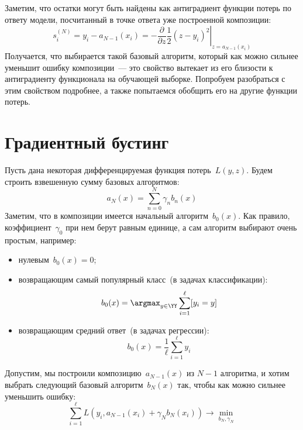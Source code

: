 \documentclass[12pt,fleqn]{article}
\begin{document}
Заметим, что остатки могут быть найдены как антиградиент функции потерь по ответу модели,
посчитанный в точке ответа уже построенной композиции:
\[
    s_i^{(N)}
    =
    y_i
    -
    a_{N - 1}(x_i)
    =
    -
    \left.
    \frac{\partial}{\partial z}
    \frac12
    (z - y_i)^2
    \right|_{z = a_{N - 1}(x_i)}
\]
Получается, что выбирается такой базовый алгоритм, который как можно
сильнее уменьшит ошибку композиции~--- это свойство вытекает из его близости
к антиградиенту функционала на обучающей выборке.
Попробуем разобраться с этим свойством подробнее, а также попытаемся обобщить его
на другие функции потерь.

\section{Градиентный бустинг}
Пусть дана некоторая дифференцируемая функция потерь~$L(y, z)$.
Будем строить взвешенную сумму базовых алгоритмов:
\[
    a_N(x)
    =
    \sum_{n = 0}^{N}
        \gamma_n b_n(x)
\]
Заметим, что в композиции имеется начальный алгоритм~$b_0(x)$.
Как правило, коэффициент~$\gamma_0$ при нем берут равным единице,
а сам алгоритм выбирают очень простым, например:
\begin{itemize}
    \item нулевым~$b_0(x) = 0$;
    \item возвращающим самый популярный класс~(в задачах классификации):
        \[
            b_0(x) = \argmax_{y \in \YY} \sum_{i = 1}^{\ell} [y_i = y]
        \]
    \item возвращающим средний ответ~(в задачах регрессии):
        \[
            b_0(x) = \frac{1}{\ell} \sum_{i = 1}^{\ell} y_i
        \]
\end{itemize}

Допустим, мы построили композицию~$a_{N - 1}(x)$ из $N - 1$ алгоритма,
и хотим выбрать следующий базовый алгоритм~$b_N(x)$ так, чтобы как можно сильнее
уменьшить ошибку:
\[
    \sum_{i = 1}^{\ell}
        L(y_i, a_{N - 1}(x_i) + \gamma_N b_N(x_i))
    \to
    \min_{b_N, \gamma_N}
\]
\end{document}
